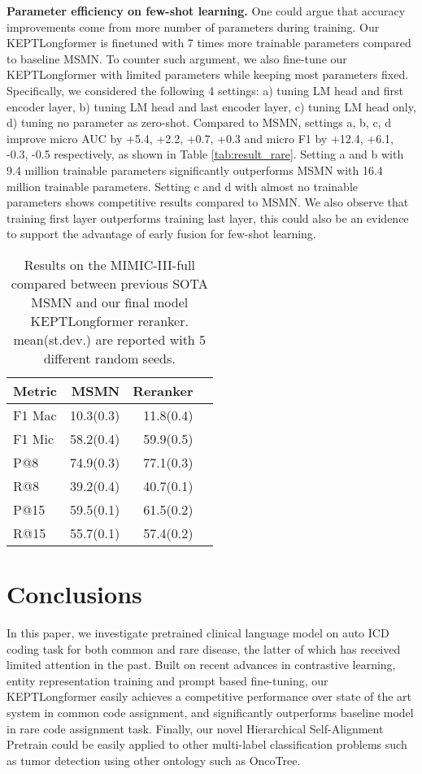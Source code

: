\documentclass[11pt]{article}
\begin{document}
\noindent \textbf{Parameter efficiency on few-shot learning.}
One could argue that accuracy improvements come from more number of parameters during training. Our KEPTLongformer is finetuned with 7 times more trainable parameters compared to baseline MSMN. To counter such argument, we also fine-tune our KEPTLongformer with limited parameters while keeping most parameters fixed. Specifically, we considered the following 4 settings: a) tuning LM head and first encoder layer, b) tuning LM head and last encoder layer, c) tuning LM head only, d) tuning no parameter as zero-shot. 
Compared to MSMN, settings a, b, c, d improve micro AUC by +5.4, +2.2, +0.7, +0.3 and micro F1 by +12.4, +6.1, -0.3, -0.5 respectively, as shown in Table \ref{tab:result_rare}.
Setting a and b with 9.4 million trainable parameters significantly outperforms MSMN with 16.4 million trainable parameters. Setting c and d with almost no trainable parameters shows competitive results compared to MSMN.
We also observe that training first layer outperforms training last layer, this could also be an evidence to support the advantage of early fusion for few-shot learning.

\begin{table}
\centering
\begin{tabular}{l|rrr}\toprule
Metric &MSMN &Reranker \\\midrule
F1 Mac &10.3(0.3) &11.8(0.4) \\
F1 Mic &58.2(0.4) &59.9(0.5) \\
P@8 &74.9(0.3) &77.1(0.3) \\
R@8 &39.2(0.4) &40.7(0.1) \\
P@15 &59.5(0.1) &61.5(0.2) \\
R@15 &55.7(0.1) &57.4(0.2) \\
\bottomrule
\end{tabular}
\caption{Results on the MIMIC-III-full compared between previous SOTA MSMN and our final model KEPTLongformer reranker. mean(st.dev.) are reported with 5 different random seeds.}
\label{tab:result_full}
\end{table}


\section{Conclusions}
In this paper, we investigate pretrained clinical language model on auto ICD coding task for both common and rare disease, the latter of which has received limited attention in the past. 
Built on recent advances in contrastive learning, entity representation training and prompt based fine-tuning, our KEPTLongformer easily achieves a competitive performance over state of the art system in common code assignment, and significantly outperforms baseline model in rare code assignment task. Finally, our novel Hierarchical Self-Alignment Pretrain could be easily applied to other multi-label classification problems such as tumor detection using other ontology such as OncoTree.
\end{document}

